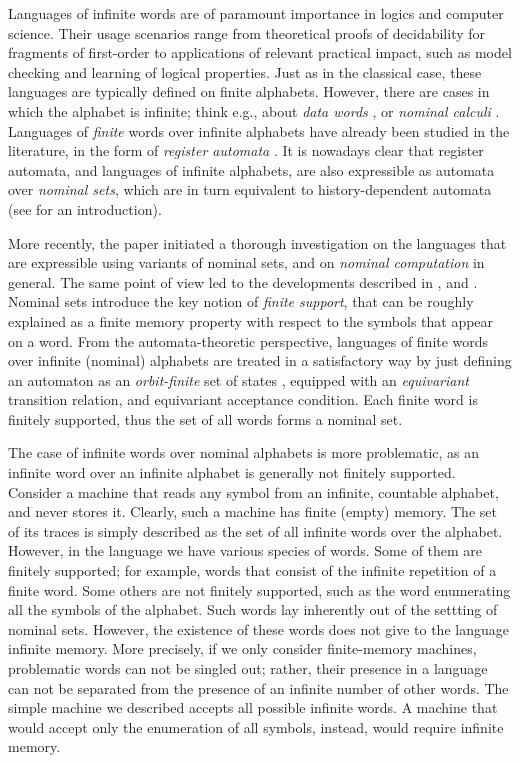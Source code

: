 

Languages of infinite words are of paramount importance in logics and computer science. Their usage scenarios range from theoretical proofs of decidability for fragments of first-order to applications of relevant practical impact, such as model checking and learning of logical properties. Just as in the classical case, these languages are typically defined on finite alphabets. However, there are cases in which the alphabet is infinite; think e.g., about \emph{data words} \cite{TODO}, or \emph{nominal calculi} \cite{Pi-calculus}. Languages of \emph{finite} words over infinite alphabets have already been studied in the literature, in the form of \emph{register automata} \cite{TODO}. It is nowadays clear that register automata, and languages of infinite alphabets, are also expressible as automata over \emph{nominal sets}, which are in turn equivalent  to history-dependent automata (see \cite{CianciaTuostoTR} for an introduction). 

More recently, the paper \cite{MikLICS} initiated a thorough investigation on the languages that are expressible using variants of nominal sets, and on \emph{nominal computation} in general. The same point of view led to the developments described in \cite{MikPOPL12}, and \cite{PittsPOPL13}. Nominal sets introduce the key notion of \emph{finite support}, that can be roughly explained as a finite memory property with respect to the symbols that appear on a word. From the automata-theoretic perspective, languages of finite words over infinite (nominal) alphabets are treated in a satisfactory way by just defining an automaton as an \emph{orbit-finite} set of states \cite{CiaMonIC}, equipped with an \emph{equivariant} transition relation, and equivariant acceptance condition. Each finite word is finitely supported, thus the set of all words forms a nominal set. 

The case of infinite words over nominal alphabets is more problematic, as an infinite word over an infinite alphabet is generally not finitely supported. Consider a machine that reads any symbol from an infinite, countable alphabet, and never stores it. Clearly, such a machine has finite (empty) memory. The set of its traces is simply described as the set of all infinite words over the alphabet. However, in the language we have various species of words. Some of them are finitely supported; for example, words that consist of the infinite repetition of a finite word. Some others are not finitely supported, such as the word enumerating all the symbols of the alphabet. Such words lay inherently out of the settting of nominal sets. However, the existence of these words does not give to the language infinite memory. More precisely, if we only consider finite-memory machines, problematic words can not be singled out; rather, their presence in a language can not be separated from the presence of an infinite number of other words. The simple machine we described accepts all possible infinite words. A machine that would accept only the enumeration of all symbols, instead, would require infinite memory. 

